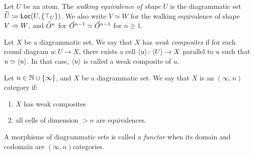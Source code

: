 \begin{dfn} 
    Let \( U \) be an atom.
    The \emph{walking equivalence of shape \( U \)} is the diagrammatic set \( \widetilde{U} \coloneqq \operatorname{\mathsf{Loc}} (U, \left\{ {\top_U} \right\}) \).
    We also write \( V \simeq W \) for the walking equivalence of shape \( V \Rightarrow W \), and \( \widetilde{O}^{n} \) for \( \vec{O}^{n - 1} \simeq \vec{O}^{n - 1} \) for \( n \geq 1 \). 
\end{dfn}


\begin{dfn} 
    Let \( X \) be a diagrammatic set.
    We say that \( X \) has \emph{weak composites} if for each round diagram \( u \colon U \to X \), there exists a cell \( \langle u\rangle \colon \langle U\rangle \to X \) parallel to \( u \) such that \( u \simeq \langle u\rangle \).
    In that case, \( \langle u\rangle \) is called a weak composite of \( u \).
\end{dfn}

\begin{dfn} 
    Let \( n \in \mathbb{N} \cup \left\{ {\infty} \right\} \), and \( X \) be a diagrammatic set.
    We say that \( X \) is an \( (\infty, n) \)\nbd category if:
    \begin{enumerate}
        \item \( X \) has weak composites
        \item all cells of dimension \( > n \) are equivalences.
    \end{enumerate}
    
    A morphisms of diagrammatic sets is called a \emph{functor} when its domain and codomain are \( (\infty, n) \)\nbd categories. 
\end{dfn}


